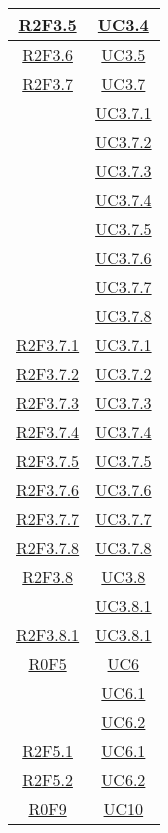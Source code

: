 \begin{longtable}{|c|c|}
\hline
\hyperlink{R2F3.5}{R2F3.5} & \hyperlink{UC3.4}{UC3.4}\\
\hline
\hyperlink{R2F3.6}{R2F3.6} & \hyperlink{UC3.5}{UC3.5}\\
\hline
\hyperlink{R2F3.7}{R2F3.7} & \hyperlink{UC3.7}{UC3.7}\\
& \hyperlink{UC3.7.1}{UC3.7.1}\\
& \hyperlink{UC3.7.2}{UC3.7.2}\\
& \hyperlink{UC3.7.3}{UC3.7.3}\\
& \hyperlink{UC3.7.4}{UC3.7.4}\\
& \hyperlink{UC3.7.5}{UC3.7.5}\\
& \hyperlink{UC3.7.6}{UC3.7.6}\\
& \hyperlink{UC3.7.7}{UC3.7.7}\\
& \hyperlink{UC3.7.8}{UC3.7.8}\\
\hline
\hyperlink{R2F3.7.1}{R2F3.7.1} & \hyperlink{UC3.7.1}{UC3.7.1}\\
\hline
\hyperlink{R2F3.7.2}{R2F3.7.2} & \hyperlink{UC3.7.2}{UC3.7.2}\\
\hline
\hyperlink{R2F3.7.3}{R2F3.7.3} & \hyperlink{UC3.7.3}{UC3.7.3}\\
\hline
\hyperlink{R2F3.7.4}{R2F3.7.4} & \hyperlink{UC3.7.4}{UC3.7.4}\\
\hline
\hyperlink{R2F3.7.5}{R2F3.7.5} & \hyperlink{UC3.7.5}{UC3.7.5}\\
\hline
\hyperlink{R2F3.7.6}{R2F3.7.6} & \hyperlink{UC3.7.6}{UC3.7.6}\\
\hline
\hyperlink{R2F3.7.7}{R2F3.7.7} & \hyperlink{UC3.7.7}{UC3.7.7}\\
\hline
\hyperlink{R2F3.7.8}{R2F3.7.8} & \hyperlink{UC3.7.8}{UC3.7.8}\\
\hline
\hyperlink{R2F3.8}{R2F3.8} & \hyperlink{UC3.8}{UC3.8}\\
& \hyperlink{UC3.8.1}{UC3.8.1}\\
\hline
\hyperlink{R2F3.8.1}{R2F3.8.1} & \hyperlink{UC3.8.1}{UC3.8.1}\\
\hline
\hyperlink{R0F5}{R0F5} & \hyperlink{UC6}{UC6}\\
& \hyperlink{UC6.1}{UC6.1}\\
& \hyperlink{UC6.2}{UC6.2}\\
\hline
\hyperlink{R2F5.1}{R2F5.1} & \hyperlink{UC6.1}{UC6.1}\\
\hline
\hyperlink{R2F5.2}{R2F5.2} & \hyperlink{UC6.2}{UC6.2}\\
\hline
\hyperlink{R0F9}{R0F9} & \hyperlink{UC10}{UC10}\\

\end{longtable}
